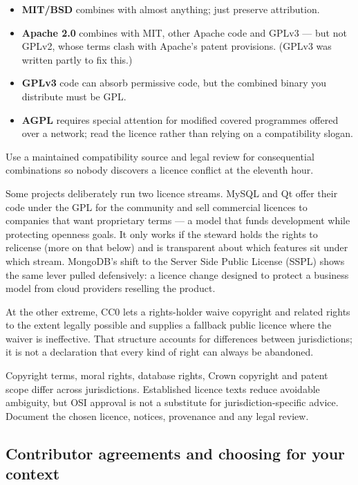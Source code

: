 \begin{itemize}[leftmargin=*]
\item \textbf{MIT/BSD} combines with almost anything; just preserve attribution.
\item \textbf{Apache 2.0} combines with MIT, other Apache code and GPLv3 — but not GPLv2, whose terms clash with Apache's patent provisions. (GPLv3 was written partly to fix this.)
\item \textbf{GPLv3} code can absorb permissive code, but the combined binary you distribute must be GPL.
\item \textbf{AGPL} requires special attention for modified covered programmes offered over a network; read the licence rather than relying on a compatibility slogan.
\end{itemize}

Use a maintained compatibility source and legal review for consequential combinations so nobody discovers a licence conflict at the eleventh hour.


Some projects deliberately run two licence streams. MySQL and Qt offer their code under the GPL for the community and sell commercial licences to companies that want proprietary terms — a model that funds development while protecting openness goals. It only works if the steward holds the rights to relicense (more on that below) and is transparent about which features sit under which stream. MongoDB's shift to the Server Side Public License (SSPL) shows the same lever pulled defensively: a licence change designed to protect a business model from cloud providers reselling the product.


At the other extreme, CC0 lets a rights-holder waive copyright and related rights to the extent legally possible and supplies a fallback public licence where the waiver is ineffective. That structure accounts for differences between jurisdictions; it is not a declaration that every kind of right can always be abandoned. \autocite{cc0}


Copyright terms, moral rights, database rights, Crown copyright and patent scope differ across jurisdictions. Established licence texts reduce avoidable ambiguity, but OSI approval is not a substitute for jurisdiction-specific advice. Document the chosen licence, notices, provenance and any legal review.



\subsection{Contributor agreements and choosing for your context}


